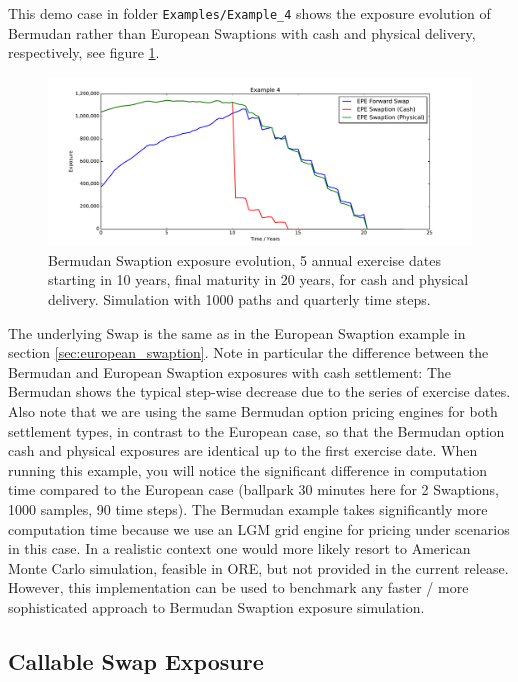 \documentclass[12pt, a4paper]{article}
\begin{document}
This demo case in folder {\tt Examples/Example\_4} shows the exposure evolution of Bermudan rather than European
Swaptions with cash and physical delivery, respectively, see figure \ref{fig_3b}.
\begin{figure}[h!]
\begin{center}
\includegraphics[scale=0.45]{mpl_bermudan_swaption.pdf}
\end{center}
\caption{Bermudan Swaption exposure evolution, 5 annual exercise dates starting in 10 years, final maturity in 20 years,
  for cash and physical delivery. Simulation with 1000 paths and quarterly time steps.}
\label{fig_3b}
\end{figure}
The underlying Swap is the same as in the European Swaption example in section \ref{sec:european_swaption}. Note in
particular the difference between the Bermudan and European Swaption exposures with cash settlement: The Bermudan shows
the typical step-wise decrease due to the series of exercise dates. Also note that we are using the same Bermudan option
pricing engines for both settlement types, in contrast to the European case, so that the Bermudan option cash and
physical exposures are identical up to the first exercise date. When running this example, you will notice the
significant difference in computation time compared to the European case (ballpark 30 minutes here for 2 Swaptions, 1000
samples, 90 time steps). The Bermudan example takes significantly more computation time because we use an LGM grid
engine for pricing under scenarios in this case. In a realistic context one would more likely resort to American Monte
Carlo simulation, feasible in ORE, but not provided in the current release. However, this implementation can be used to
benchmark any faster / more sophisticated approach to Bermudan Swaption exposure simulation.

\subsection{Callable Swap Exposure}
\end{document}
